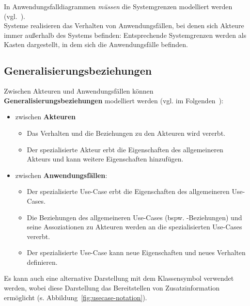 \noindent
In Anwendungsfalldiagrammen \textit{müssen} die Systemgrenzen modelliert werden (vgl.~\cite[52]{Buh09}).\\
Systeme realisieren das Verhalten von Anwendungsfällen, bei denen sich Akteure immer außerhalb des Systems befinden: Entsprechende Systemgrenzen werden als Kasten dargestellt, in dem sich  die Anwendungsfälle befinden.

\subsection{Generalisierungsbeziehungen}
Zwischen Akteuren und Anwendungsfällen können \textbf{Generalisierungsbeziehungen} modelliert werden (vgl. im Folgenden~\cite[66]{Bal05}):

\begin{itemize}
    \item zwischen \textbf{Akteuren}
    \begin{itemize}
        \item Das Verhalten und die Beziehungen zu den Akteuren wird vererbt.
        \item Der spezialisierte Akteur erbt die Eigenschaften des allgemeineren Akteurs und kann weitere Eigenschaften hinzufügen.
    \end{itemize}
    \item zwischen \textbf{Anwendungsfällen}:
    \begin{itemize}
        \item Der spezialisierte Use-Case erbt die Eigenschaften des allgemeineren Use-Cases.
        \item Die Beziehungen des allgemeineren Use-Cases (bspw. -Beziehungen) und seine Assoziationen zu Akteuren werden an die spezialisierten Use-Cases vererbt.
        \item Der spezialisierte Use-Case kann neue Eigenschaften und neues Verhalten definieren.
    \end{itemize}
\end{itemize}

\noindent
Es kann auch eine alternative Darstellung mit dem Klassensymbol verwendet werden, wobei diese Darstellung das Bereitstellen von Zusatzinformation ermöglicht (s. Abbildung~\ref{fig:usecase-notation}).


